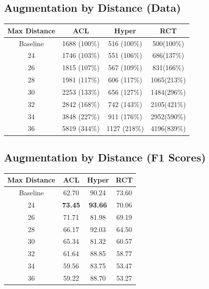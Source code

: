 \documentclass[11pt]{article}
\begin{document}
\subsection{Augmentation by Distance (Data)}
\label{sec:org58a4129}
\begin{center}
\begin{tabular}{|c|c|c|c|}
\hline
Max Distance & ACL & Hyper & RCT\\
\hline
Baseline & 1688 (100\%) & 516 (100\%) & 500(100\%)\\
\hline
24 & 1746 (103\%) & 551 (106\%) & 686(137\%)\\
\hline
26 & 1815 (107\%) & 567 (109\%) & 831(166\%)\\
\hline
28 & 1981 (117\%) & 606 (117\%) & 1065(213\%)\\
\hline
30 & 2253 (133\%) & 656 (127\%) & 1484(296\%)\\
\hline
32 & 2842 (168\%) & 742 (143\%) & 2105(421\%)\\
\hline
34 & 3848 (227\%) & 911 (176\%) & 2952(590\%)\\
\hline
36 & 5819 (344\%) & 1127 (218\%) & 4196(839\%)\\
\hline
\end{tabular}
\end{center}



\subsection{Augmentation by Distance (F1 Scores)}
\label{sec:orgd2e799b}
\begin{center}
\begin{tabular}{|c|c|c|c|}
\hline
Max Distance & ACL & Hyper & RCT\\
\hline
Baseline & 62.70 & 90.24 & 73.60\\
\hline
24 & \textbf{73.45} & \textbf{93.66} & 70.06\\
\hline
26 & 71.71 & 81.98 & 69.19\\
\hline
28 & 66.17 & 92.03 & 64.50\\
\hline
30 & 65.34 & 81.32 & 60.57\\
\hline
32 & 61.64 & 88.85 & 58.77\\
\hline
34 & 59.56 & 83.75 & 53.47\\
\hline
36 & 59.22 & 88.70 & 53.27\\
\hline
\end{tabular}
\end{center}
\end{document}
